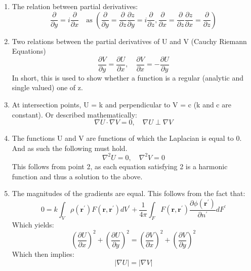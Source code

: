\begin{enumerate}
    \item The relation between partial derivatives: 
    \begin{equation}
        \frac{\partial}{\partial y} = i\frac{\partial}{\partial x} \quad \text{as } \left( \frac{\partial}{\partial y} = \frac{\partial}{\partial z} \frac{\partial z}{\partial y} = i\frac{\partial}{\partial z}, \frac{\partial}{\partial x } = \frac{\partial}{\partial z} \frac{\partial z}{\partial x} = \frac{\partial}{\partial z } \right)
    \end{equation}
    \item Two relations between the partial derivatives of U and V (Cauchy Riemann Equations)
    \begin{equation}
        \frac{\partial V}{\partial y} = \frac{\partial U}{\partial x}, \quad \frac{\partial V}{\partial x} =-\frac{\partial U}{\partial y}       
    \end{equation}
    In short, this is used to show whether a function is a regular (analytic and single valued) one of z.
    \item At intersection points, U = k and perpendicular to V = c (k and c are constant). Or described mathematically:
    \begin{equation}
        \nabla U \cdot \nabla V = 0, \quad \nabla U \perp \nabla V
    \end{equation}
    \item The functions U and V are functions of which the Laplacian is equal to 0. And as such the following must hold.
    \begin{equation}
        \nabla ^2 U = 0 , \quad \nabla ^2 V = 0
    \end{equation}
    This follows from point 2, as each equation satisfying 2 is a harmonic function and thus a solution to the above.
    \item The magnitudes of the gradients are equal. This follows from the fact that:
    \begin{equation}
        0=k \int_{V} \rho\left(\mathbf{r}^{\prime}\right) F\left(\mathbf{r}, \mathbf{r}^{\prime}\right) d V^{\prime}+\frac{1}{4 \pi} \int_{F} F\left(\mathbf{r}, \mathbf{r}^{\prime}\right) \frac{\partial \phi\left(\mathbf{r}^{\prime}\right)}{\partial n^{\prime}} d F^{\prime}
    \end{equation}
    Which yields:
    \begin{equation}
        \left( \frac{\partial U}{\partial x}  \right)^2 +\left( \frac{\partial U}{\partial y}  \right)^2 = \left( \frac{\partial V}{\partial x}  \right)^2 + \left( \frac{\partial V}{\partial y}  \right)^2
    \end{equation}
    Which then implies:
    \begin{equation}
        |\nabla U  | = |\nabla V|
    \end{equation}
\end{enumerate}
